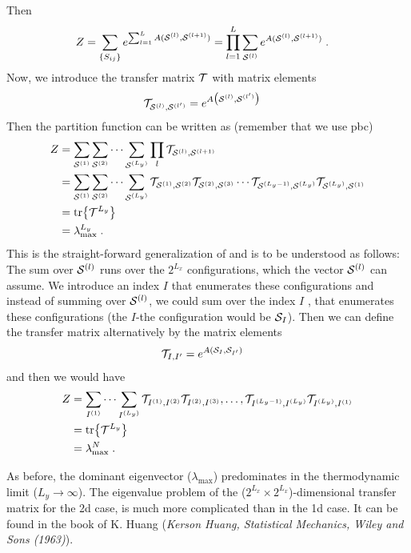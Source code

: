 Then 
%
\begin{align*}
Z &= \sum_{\{S_{ij}\}} e^{\sum_{l=1}^{L} A({ \mathbf {\cal S}^{(l)}},{ \mathbf {\cal S}^{(l+1)}}) }
 = \prod_{l=1}^{L} \sum_{{ \mathbf {\cal S}^{(l)}}}  e^{ A({ \mathbf {\cal S}^{(l)}},{ \mathbf {\cal S}^{(l+1)}}) }\;.
\end{align*}
%
Now, we introduce the transfer matrix ${\cal T}$ with matrix elements
%
\begin{align*}
{\cal T}_{{ \mathbf {\cal S}^{(l)}},{ \mathbf {\cal S}^{(l')}}} &= e^{A\big({ \mathbf {\cal S}^{(l)}},{ \mathbf {\cal S}^{(l')}}\big)}
\end{align*}
%
Then the partition function can be written as (remember that we use pbc)
%
\begin{align*}
Z &= \sum_{{ \mathbf {\cal S}^{(1)}}} \sum_{{ \mathbf {\cal S}^{(2)}}}\cdots  \sum_{{ \mathbf {\cal S}^{(L_{y})}}}\prod_{l} {\cal T}_{{ \mathbf {\cal S}^{(l)}},{ \mathbf {\cal S}^{(l+1)}}}\\
&= \sum_{{ \mathbf {\cal S}^{(1)}}} \sum_{{ \mathbf {\cal S}^{(2)}}}\cdots  \sum_{{ \mathbf {\cal S}^{(L_{y})}}} {\cal T}_{{ \mathbf {\cal S}^{(1)}},{ \mathbf {\cal S}^{(2)}}}{\cal T}_{{ \mathbf {\cal S}^{(2)}},{ \mathbf {\cal S}^{(3)}}}\cdots {\cal T}_{{ \mathbf {\cal S}^{(L_{y}-1)}},{ \mathbf {\cal S}^{(L_{y})}}}
 {\cal T}_{{ \mathbf {\cal S}^{(L_{y})}},{ \mathbf {\cal S}^{(1)}}}\\
&= \tr{{\cal T}^{L_{y}}} \\
&= \lambda_\text{max}^{L_{y}}\;.
\end{align*}
%
This is the straight-forward generalization of 
and  is to be understood as follows: 
The sum over ${ \mathbf {\cal S}^{(l)}}$ runs over 
the $2^{L_{x}}$ configurations, which the vector ${ \mathbf {\cal S}^{(l)}}$ can assume. 
We introduce an index $I$ that enumerates these configurations and 
instead of summing over ${ \mathbf {\cal S}^{(l)}}$, we could sum over the index $I$ , that enumerates 
these configurations (the $I$-the configuration would be ${\cal S}_{I}$). Then we can define the transfer matrix alternatively by the matrix elements
\begin{align*}
{\cal T}_{I,I'} &= e^{A({\cal S}_{I}, {\cal S}_{I'})}
\end{align*}
%
and then we would have
%
\begin{align*}
Z &=  \sum_{I^{(1)}} \cdots  \sum_{I^{(L_{y})}} {\cal T}_{I^{(1)},I^{(2)}}
{\cal T}_{I^{(2)},I^{(3)}},\ldots,{\cal T}_{I^{(L_{y}-1)},I^{(L_{y})}}
{\cal T}_{I^{(L_{y})},I^{(1)}}\\
&= \tr{{\cal T}^{L_{y}}} \\
&= \lambda_\text{max}^{N}\;.
\end{align*}
%

%
As before, the dominant eigenvector ($\lambda_\text{max}$) predominates in the thermodynamic limit ($L_{y}\to \infty$). The eigenvalue problem
of the  ($2^{L_{x}}\times 2^{L_{x}}$)-dimensional transfer matrix for the 2d case, is much more complicated than  in the
1d case. It can be found in the book of K. Huang
({\em Kerson Huang, Statistical Mechanics, Wiley and Sons (1963)}).

